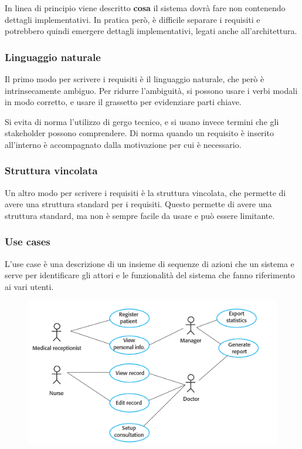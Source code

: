 In linea di principio viene descritto \textbf{cosa} il sistema dovrà fare non contenendo
dettagli implementativi. In pratica però, è difficile separare i requisiti e 
potrebbero quindi emergere dettagli implementativi, legati anche all'architettura. 
\subsubsection{Linguaggio naturale}
Il primo modo per scrivere i requisiti è il linguaggio naturale, che però è
intrinsecamente ambiguo. Per ridurre l'ambiguità, si possono usare i verbi modali
in modo corretto, e usare il grassetto per evidenziare parti chiave.

Si evita di norma l'utilizzo di gergo tecnico, e si usano invece termini
che gli stakeholder possono comprendere. Di norma quando un requisito è
inserito all'interno è accompagnato dalla motivazione per cui è necessario.
\subsubsection{Struttura vincolata}
Un altro modo per scrivere i requisiti è la struttura vincolata, che permette
di avere una struttura standard per i requisiti. Questo permette di avere
una struttura standard, ma non è sempre facile da usare e può essere limitante.
\subsubsection{Use cases}
L'use case è una descrizione di un insieme di sequenze di azioni che un sistema
e serve per identificare gli attori e le funzionalità del sistema che fanno 
riferimento ai vari utenti.
\begin{figure}[H]
    \centering
    \includegraphics[scale=0.4]{img/usecase.png}
\end{figure}
